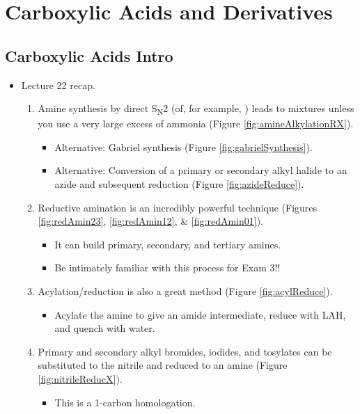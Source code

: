 \documentclass[../notes.tex]{subfiles}
\begin{document}
\chapter{Carboxylic Acids and Derivatives}
\setcounter{section}{22}
\section{Carboxylic Acids Intro}
\begin{itemize}
    \item {}Lecture 22 recap.
    \begin{enumerate}[label={\Alph*.}]
        \item Amine synthesis by direct S\textsubscript{N}2 (of, for example, ) leads to mixtures unless you use a very large excess of ammonia (Figure \ref{fig:amineAlkylationRX}).
        \begin{itemize}
            \item Alternative: Gabriel synthesis (Figure \ref{fig:gabrielSynthesis}).
            \item Alternative: Conversion of a primary or secondary alkyl halide to an azide and subsequent reduction (Figure \ref{fig:azideReduce}).
        \end{itemize}
        \item Reductive amination is an incredibly powerful technique (Figures \ref{fig:redAmin23}, \ref{fig:redAmin12}, \& \ref{fig:redAmin01}).
        \begin{itemize}
            \item It can build primary, secondary, and tertiary amines.
            \item Be intimately familiar with this process for Exam 3!!
        \end{itemize}
        \item Acylation/reduction is also a great method (Figure \ref{fig:acylReduce}).
        \begin{itemize}
            \item Acylate the amine to give an amide intermediate, reduce with LAH, and quench with water.
        \end{itemize}
        \item Primary and secondary alkyl bromides, iodides, and tosylates can be substituted to the nitrile and reduced to an amine (Figure \ref{fig:nitrileReducX}).
        \begin{itemize}
            \item This is a 1-carbon homologation.

\end{itemize}
\end{enumerate}
\end{itemize}
\end{document}
